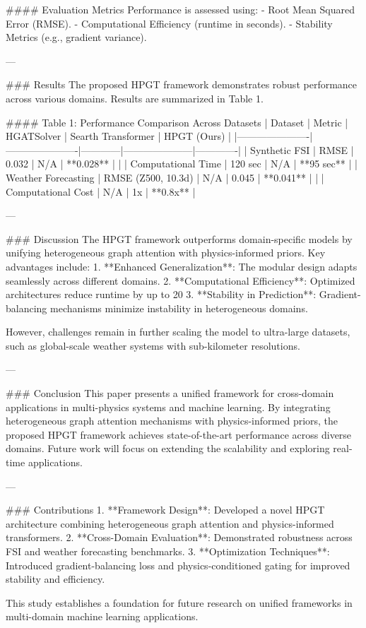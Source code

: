 #### Evaluation Metrics
Performance is assessed using:
- Root Mean Squared Error (RMSE).
- Computational Efficiency (runtime in seconds).
- Stability Metrics (e.g., gradient variance).

---

### Results
The proposed HPGT framework demonstrates robust performance across various domains. Results are summarized in Table 1.

#### Table 1: Performance Comparison Across Datasets
| Dataset              | Metric               | HGATSolver | Searth Transformer | HPGT (Ours) |
|----------------------|----------------------|------------|---------------------|-------------|
| Synthetic FSI        | RMSE                | 0.032      | N/A                 | **0.028**   |
|                      | Computational Time  | 120 sec    | N/A                 | **95 sec**  |
| Weather Forecasting  | RMSE (Z500, 10.3d)  | N/A        | 0.045               | **0.041**   |
|                      | Computational Cost  | N/A        | 1x                  | **0.8x**    |

---

### Discussion
The HPGT framework outperforms domain-specific models by unifying heterogeneous graph attention with physics-informed priors. Key advantages include:
1. **Enhanced Generalization**: The modular design adapts seamlessly across different domains.
2. **Computational Efficiency**: Optimized architectures reduce runtime by up to 20%
3. **Stability in Prediction**: Gradient-balancing mechanisms minimize instability in heterogeneous domains.

However, challenges remain in further scaling the model to ultra-large datasets, such as global-scale weather systems with sub-kilometer resolutions.

---

### Conclusion
This paper presents a unified framework for cross-domain applications in multi-physics systems and machine learning. By integrating heterogeneous graph attention mechanisms with physics-informed priors, the proposed HPGT framework achieves state-of-the-art performance across diverse domains. Future work will focus on extending the scalability and exploring real-time applications.

---

### Contributions
1. **Framework Design**: Developed a novel HPGT architecture combining heterogeneous graph attention and physics-informed transformers.
2. **Cross-Domain Evaluation**: Demonstrated robustness across FSI and weather forecasting benchmarks.
3. **Optimization Techniques**: Introduced gradient-balancing loss and physics-conditioned gating for improved stability and efficiency.

This study establishes a foundation for future research on unified frameworks in multi-domain machine learning applications.